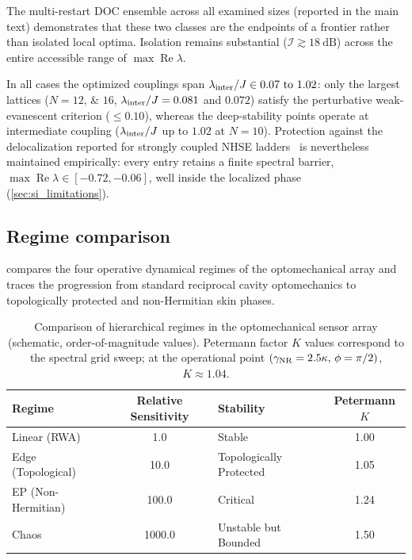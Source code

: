 \documentclass[aps,prxquantum,preprint,superscriptaddress,amsmath,amssymb]{revtex4-2}
\newcommand{\Real}{\operatorname{Re}}
\newcommand{\Iso}{\mathcal{I}}
\newcommand{\gNR}{\gamma_{\rm NR}}
\newcommand{\lint}{\lambda_{\rm inter}}
\begin{document}
The multi-restart DOC ensemble across all examined sizes (reported in the main text) demonstrates that these two classes are the endpoints of a frontier rather than isolated local optima. Isolation remains substantial ($\Iso\gtrsim\qty{18}{\dB}$) across the entire accessible range of $\max\Real\lambda$.

In all cases the optimized couplings span $\lint/J\in\numrange{0.07}{1.02}$: only the largest lattices ($N=\numlist{12;16}$, $\lint/J=\num{0.081}$ and $\num{0.072}$) satisfy the perturbative weak-evanescent criterion ($\le\num{0.10}$), whereas the deep-stability points operate at intermediate coupling ($\lint/J$ up to $1.02$ at $N=\num{10}$). Protection against the delocalization reported for strongly coupled NHSE ladders~\citep{Wang2025} is nevertheless maintained empirically: every entry retains a finite spectral barrier, $\max\Real\lambda\in[\num{-0.72},\num{-0.06}]$, well inside the localized phase (\cref{sec:si_limitations}).

\subsection{Regime comparison}
\label{sec:si_regime}

 compares the four operative dynamical regimes of the optomechanical array and traces the progression from standard reciprocal cavity optomechanics to topologically protected and non-Hermitian skin phases.

\begin{table}[hbt]
\centering
\caption{Comparison of hierarchical regimes in the optomechanical sensor array (schematic, order-of-magnitude values). Petermann factor $K$ values correspond to the spectral grid sweep; at the operational point $(\gNR=\num{2.5}\kappa,\,\phi=\pi/2)$, $K\approx\num{1.04}$.}
\label{tab:trackC_regimes}
\begin{tabular}{l S l S}
\toprule
\textbf{Regime} & {\textbf{Relative Sensitivity}} & \textbf{Stability} & {\textbf{Petermann $K$}} \\
\midrule
Linear (RWA) & 1.0 & Stable & 1.00 \\
Edge (Topological) & 10.0 & Topologically Protected & 1.05 \\
EP (Non-Hermitian) & 100.0 & Critical & 1.24 \\
Chaos & 1000.0 & Unstable but Bounded & 1.50 \\
\bottomrule
\end{tabular}
\end{table}
\end{document}
